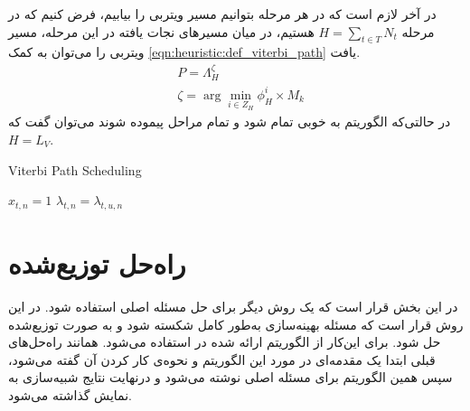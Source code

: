 	در آخر لازم است که در هر مرحله بتوانیم مسیر ویتربی را بیابیم، فرض کنیم که در مرحله $\displaystyle H = \sum_{t \in T}N_t$ هستیم، در میان مسیرهای نجات یافته در این مرحله، مسیر ویتربی را می‌توان به کمک \cref{eqn:heuristic:def_viterbi_path} یافت.
\begin{subequations}
	\begin{align}\label{eqn:heuristic:def_viterbi_path}
		&P = \Lambda_H^\zeta \\
		&\zeta = \arg \min_{i \in Z_H} \phi_H^i \times M_k
	\end{align}
\end{subequations}
در حالتی‌که الگوریتم به خوبی تمام شود و تمام مراحل پیموده شوند می‌توان گفت که $H=L_V$.
\begin{latin}
	\begin{algorithm}
		\caption{Viterbi Path Scheduling}
		\label{alg:viterbi_path_scheduling}
		\begin{algorithmic}[1]
			\State $x_{t,n} = 1$
			\State $\lambda_{t,n} = \lambda_{t,u,n}$
			\EndIf
			\EndFor
		\end{algorithmic}
	\end{algorithm}
\end{latin}

\section{راه‌حل توزیع‌شده}

در این بخش قرار است که یک روش دیگر برای حل مسئله اصلی استفاده شود. در این روش قرار است که مسئله بهینه‌سازی به‌طور کامل شکسته شود و به صورت توزیع‌شده حل شود. برای این‌کار از الگوریتم ارائه شده در \cite{testa2019distributed} استفاده می‌شود. همانند راه‌حل‌های قبلی ابتدا یک مقدمه‌ای  در مورد این الگوریتم و نحوه‌ی کار کردن آن گفته می‌شود، سپس همین الگوریتم برای مسئله اصلی نوشته می‌شود و درنهایت نتایج شبیه‌سازی به نمایش گذاشته می‌شود. 
